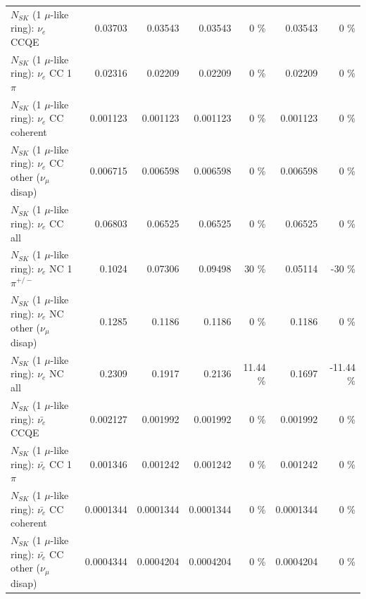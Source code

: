 \begin{table}
\begin{tabular}{| l | r | r | r  r | r  r |}
\hline
\hline
\hline
                                      $N_{SK}$ (1 $\mu$-like ring): $\nu_e$ CCQE &         0.03703 &         0.03543 &         0.03543 &        0 \%  &         0.03543 &        0 \%  \\ 
                                 $N_{SK}$ (1 $\mu$-like ring): $\nu_e$ CC 1$\pi$ &         0.02316 &         0.02209 &         0.02209 &        0 \%  &         0.02209 &        0 \%  \\ 
                               $N_{SK}$ (1 $\mu$-like ring): $\nu_e$ CC coherent &        0.001123 &        0.001123 &        0.001123 &        0 \%  &        0.001123 &        0 \%  \\ 
                $N_{SK}$ (1 $\mu$-like ring): $\nu_e$ CC other ($\nu_\mu$ disap) &        0.006715 &        0.006598 &        0.006598 &        0 \%  &        0.006598 &        0 \%  \\ 
                                  $N_{SK}$ (1 $\mu$-like ring): $\nu_{e}$ CC all &         0.06803 &         0.06525 &         0.06525 &        0 \%  &         0.06525 &        0 \%  \\ 
\hline
                           $N_{SK}$ (1 $\mu$-like ring): $\nu_e$ NC 1$\pi^{+/-}$ &          0.1024 &         0.07306 &         0.09498 &       30 \%  &         0.05114 &      -30 \%  \\ 
                $N_{SK}$ (1 $\mu$-like ring): $\nu_e$ NC other ($\nu_\mu$ disap) &          0.1285 &          0.1186 &          0.1186 &        0 \%  &          0.1186 &        0 \%  \\ 
                                  $N_{SK}$ (1 $\mu$-like ring): $\nu_{e}$ NC all &          0.2309 &          0.1917 &          0.2136 &    11.44 \%  &          0.1697 &   -11.44 \%  \\ 
\hline
\hline
\hline
                                $N_{SK}$ (1 $\mu$-like ring): $\bar{\nu_e}$ CCQE &        0.002127 &        0.001992 &        0.001992 &        0 \%  &        0.001992 &        0 \%  \\ 
                           $N_{SK}$ (1 $\mu$-like ring): $\bar{\nu_e}$ CC 1$\pi$ &        0.001346 &        0.001242 &        0.001242 &        0 \%  &        0.001242 &        0 \%  \\ 
                         $N_{SK}$ (1 $\mu$-like ring): $\bar{\nu_e}$ CC coherent &       0.0001344 &       0.0001344 &       0.0001344 &        0 \%  &       0.0001344 &        0 \%  \\ 
          $N_{SK}$ (1 $\mu$-like ring): $\bar{\nu_e}$ CC other ($\nu_\mu$ disap) &       0.0004344 &       0.0004204 &       0.0004204 &        0 \%  &       0.0004204 &        0 \%  \\ 

\end{tabular}
\end{table}
